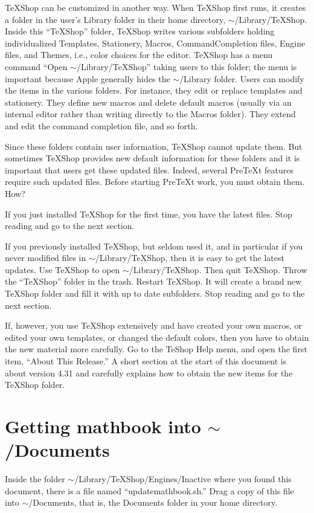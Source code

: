 \documentclass[11pt, oneside]{article}   	%
\begin{document}
TeXShop can be customized in another way. When TeXShop first runs, it creates a folder in the user's Library folder in their home directory,  $\sim$/Library/TeXShop. Inside this ``TeXShop'' folder, TeXShop writes various subfolders  holding individualized  Templates, Stationery, Macros, CommandCompletion files, Engine files, and Themes, i.e., color choices for the editor. TeXShop has a menu command ``Open $\sim$/Library/TeXShop'' taking users to this folder; the menu is important because Apple generally hides the $\sim$/Library folder. Users can modify the items in the various folders. For instance, they edit or replace  templates and  stationery. They define new macros and delete  default macros (usually via an internal editor rather than writing directly to the Macros folder). They extend and edit the command completion file, and so forth.

Since these folders contain user information, TeXShop cannot update them. But sometimes TeXShop provides new default information for these folders and it is important that users get these updated files.  Indeed, several PreTeXt features require such updated files. Before starting PreTeXt work, you must obtain them. How?

If you just installed TeXShop for the first time, you have the latest files. Stop reading and go to the next section.

If you previously installed TeXShop, but seldom used it, and in particular if you never modified files in $\sim$/Library/TeXShop, then it is easy to get the latest updates. Use TeXShop to open $\sim$/Library/TeXShop. Then quit TeXShop.
Throw the ``TeXShop'' folder in the trash. Restart TeXShop. It will create a brand new TeXShop folder and fill it with up to date subfolders. Stop reading and go to the next section.

If, however, you use TeXShop extensively and have created your own macros, or edited your own templates, or changed the default colors, then you have to obtain the new material more carefully. Go to the TeShop Help menu, and open the first item, ``About This Release.''  A short section at the start of this document is about version 4.31 and carefully explains how to obtain the new items for the TeXShop folder.
 

\section{Getting mathbook into $\sim$/Documents}

Inside the folder $\sim$/Library/TeXShop/Engines/Inactive where you found this document, there is a file named ``updatemathbook.sh.'' Drag a copy of this file into $\sim$/Documents, that is, the Documents folder in your home directory. 
\end{document}
